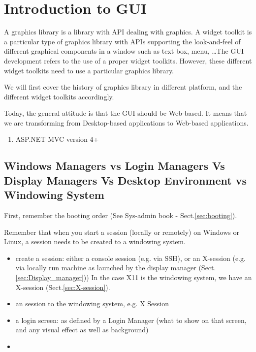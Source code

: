 \chapter{Introduction to GUI}
\label{chap:introduction}

A graphics library is a library with API dealing with graphics.
A widget toolkit is a particular type of graphics library with APIs supporting
the look-and-feel of different graphical components in a window such as text
box, menu, \ldots The GUI development refers to the use of a proper widget
toolkits. However, these different widget toolkits need to use a particular
graphics library.

We will first cover the history of graphics library in different platform, and 
the different widget toolkits accordingly.

Today, the general attitude is that the GUI should be Web-based. It means that
we are transforming from Desktop-based applications to Web-based applications.
\begin{enumerate}
  \item ASP.NET MVC version 4+
\end{enumerate}

\section{Windows Managers vs Login Managers Vs Display
Managers Vs Desktop Environment vs Windowing System}

First, remember the booting order (See Sys-admin book - Sect.\ref{sec:booting}).

Remember that when you start a session (locally or remotely) on Windows or
Linux, a session needs to be created to a windowing system.
 
\begin{itemize}
 \item create a session: either a console session (e.g. via SSH), or an
 X-session (e.g. via locally run machine as launched by the display manager
 (Sect.\ref{sec:Display_manager})) In the case X11 is the windowing system, we have an
 X-session (Sect.\ref{sec:X-session}).

  \item an session to the windowing system, e.g. X Session 
  
  
  
  \item a login screen: as defined by a Login Manager (what to show on that
  screen, and any visual effect as well as background)
  
  
  \item 
\end{itemize}

